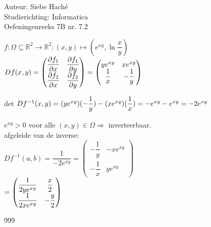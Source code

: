 \documentclass[a4paper]{article}
\newcommand{\R}{\mathbb{R}}
\begin{document}
\noindent \large Auteur: Siebe Haché \\
\noindent \large Studierichting: Informatica \\
\noindent \large Oefeningenreeks 7B nr. 7.2\\

\medskip
\normalsize

$f:\Omega \subseteq \R^2\longrightarrow \R^2:(x,y)\longmapsto(e^{xy},\ln\dfrac{x}{y})$ 
 \\

$Df(x,y) = \begin{pmatrix} \dfrac{\partial f_1}{\partial x} & \dfrac{\partial f_1}{\partial y} \\ 
                           \dfrac{\partial f_2}{\partial x} & \dfrac{\partial f_2}{\partial y} \end{pmatrix}
= 
            \begin{pmatrix} y e^{xy} & x e^{xy} \\
                        \dfrac{1}{x} & -\dfrac{1}{y} \end{pmatrix} \\$

det $Df^{-1}(x,y) = (y e^{xy})(-\dfrac{1}{y}) - (x e^{xy})(\dfrac{1}{x}) = -e^{xy} - e^{xy} = -2e^{xy} \\$

$e^{xy} > 0$ voor alle $(x,y) \in \Omega \Rightarrow$ inverteerbaar.\\

afgeleide van de inverse: \\

$Df^{-1}(a,b) = \dfrac{1}{-2e^{xy}} =             \begin{pmatrix}  -\dfrac{1}{y}& -xe^{xy} \\
                                                                  -\dfrac{1}{x} &  y e^{xy} \end{pmatrix}$\\
                                                                  
                                   $ =              \begin{pmatrix}  \dfrac{1}{2ye^{xy}}& \dfrac{x}{2} \\
                                                                  \dfrac{1}{2xe^{xy}} & -\dfrac{y}{2} \end{pmatrix}\\$

\begin{thebibliography}{999}
\end{thebibliography}
\end{document}
